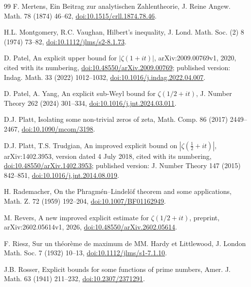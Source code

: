 \documentclass[11pt,a4paper]{article}
\numberwithin{equation}{section}
\theoremstyle{definition}
\theoremstyle{remark}
\begin{document}
\begin{thebibliography}{99}
 F. Mertens, Ein Beitrag zur analytischen Zahlentheorie, J. Reine Angew. Math. 78 (1874) 46--62, \href{https://doi.org/10.1515/crll.1874.78.46}{doi:10.1515/crll.1874.78.46}.

 H.L. Montgomery, R.C. Vaughan, Hilbert's inequality, J. Lond. Math. Soc. (2) 8 (1974) 73--82, \href{https://doi.org/10.1112/jlms/s2-8.1.73}{doi:10.1112/jlms/s2-8.1.73}.

 D. Patel, An explicit upper bound for $|\zeta(1+it)|$, arXiv:2009.00769v1, 2020, cited with its numbering, \href{https://doi.org/10.48550/arXiv.2009.00769}{doi:10.48550/arXiv.2009.00769}; published version: Indag. Math. 33 (2022) 1012--1032, \href{https://doi.org/10.1016/j.indag.2022.04.007}{doi:10.1016/j.indag.2022.04.007}.

 D. Patel, A. Yang, An explicit sub-Weyl bound for $\zeta(1/2+it)$, J. Number Theory 262 (2024) 301--334, \href{https://doi.org/10.1016/j.jnt.2024.03.011}{doi:10.1016/j.jnt.2024.03.011}.

 D.J. Platt, Isolating some non-trivial zeros of zeta, Math. Comp. 86 (2017) 2449--2467, \href{https://doi.org/10.1090/mcom/3198}{doi:10.1090/mcom/3198}.

 D.J. Platt, T.S. Trudgian, An improved explicit bound on $|\zeta(\frac12+it)|$, arXiv:1402.3953, version dated 4 July 2018, cited with its numbering, \href{https://doi.org/10.48550/arXiv.1402.3953}{doi:10.48550/arXiv.1402.3953}; published version: J. Number Theory 147 (2015) 842--851, \href{https://doi.org/10.1016/j.jnt.2014.08.019}{doi:10.1016/j.jnt.2014.08.019}.

 H. Rademacher, On the Phragm\'en--Lindel\"of theorem and some applications, Math. Z. 72 (1959) 192--204, \href{https://doi.org/10.1007/BF01162949}{doi:10.1007/BF01162949}.

 M. Revers, A new improved explicit estimate for $\zeta(1/2+it)$, preprint, arXiv:2602.05614v1, 2026, \href{https://doi.org/10.48550/arXiv.2602.05614}{doi:10.48550/arXiv.2602.05614}.

 F. Riesz, Sur un th\'eor\`eme de maximum de MM. Hardy et Littlewood, J. London Math. Soc. 7 (1932) 10--13, \href{https://doi.org/10.1112/jlms/s1-7.1.10}{doi:10.1112/jlms/s1-7.1.10}.

 J.B. Rosser, Explicit bounds for some functions of prime numbers, Amer. J. Math. 63 (1941) 211--232, \href{https://doi.org/10.2307/2371291}{doi:10.2307/2371291}.


\end{thebibliography}
\end{document}
